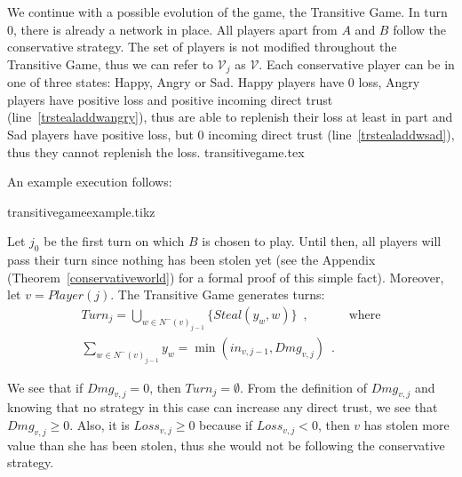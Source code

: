   We continue with a possible evolution of the game, the Transitive Game. In turn 0, there is already a network in place. All
  players apart from $A$ and $B$ follow the conservative strategy. The set of players is not modified throughout the
  Transitive Game, thus we can refer to $\mathcal{V}_j$ as $\mathcal{V}$. Each conservative player can be in one of three
  states: Happy, Angry or Sad. Happy players have 0 loss, Angry players have positive loss and positive incoming direct trust
  (line~\ref{trstealaddwangry}), thus are able to replenish their loss at least in part and Sad players have positive loss,
  but 0 incoming direct trust (line~\ref{trstealaddwsad}), thus they cannot replenish the loss.
  {transitivegame.tex}

  \noindent An example execution follows:

  {transitivegameexample.tikz}

  \noindent Let $j_0$ be the first turn on which $B$ is chosen to play. Until then, all players will pass their turn since
  nothing has been stolen yet (see the Appendix (Theorem~\ref{conservativeworld}) for a formal proof of this simple fact).
  Moreover, let $v = Player(j)$. The Transitive Game generates turns:
  \begin{align}
     Turn_j = \bigcup\limits_{w \in N^{-}\left(v\right)_{j-1}}\{Steal\left(y_w,w\right)\} \enspace, & \mbox{ where} \\
     \sum\limits_{w \in N^{-}\left(v\right)_{j-1}}y_w = \min\left(in_{v, j-1}, Dmg_{v, j}\right) \enspace. &
  \end{align}
 
  \noindent We see that if $Dmg_{v, j} = 0$, then $Turn_j = \emptyset$. From the definition of $Dmg_{v,j}$ and knowing that no
  strategy in this case can increase any direct trust, we see that $Dmg_{v,j} \geq 0$. Also, it is $Loss_{v,j} \geq 0$ because
  if $Loss_{v,j} < 0$, then $v$ has stolen more value than she has been stolen, thus she would not be following the
  conservative strategy.
